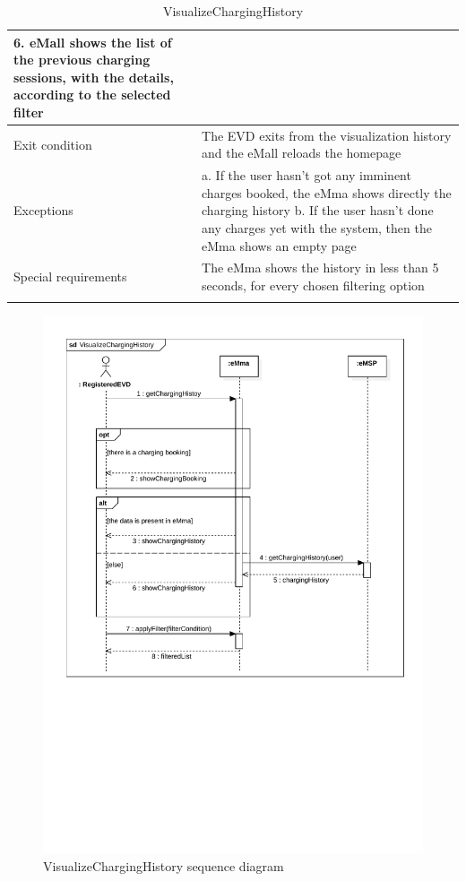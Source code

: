 \begin{center}
\begin{longtable}{p{4cm} p{11cm}}
        6. eMall shows the list of the previous charging sessions, with the details, according to the selected filter\\
     \hline
     Exit condition & The EVD exits from the visualization history and the eMall reloads the homepage \\
     \hline
     Exceptions & 
        a. If the user hasn't got any imminent charges booked, the eMma shows directly the charging history \newline
        b. If the user hasn't done any charges yet with the system, then the eMma shows an empty page \\
     \hline
     Special requirements &  The eMma shows the history in less than 5 seconds, for every chosen filtering option\\
     \hline
    \caption{VisualizeChargingHistory}
    \label{tab:VisualizeChargingHistory}
    \end{longtable}
\end{center}

\begin{figure}[H]
    \centering
    \includegraphics[width=\textwidth, trim={0 9cm 0 0}, clip]{Images/cp3/seqDiagrams/VisualizeChargingHistory.pdf}
    \caption{VisualizeChargingHistory sequence diagram}
\end{figure}

